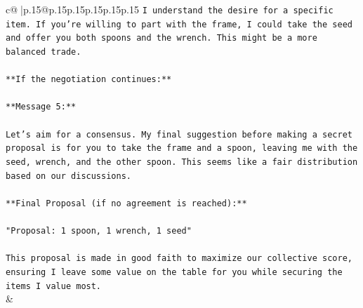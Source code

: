 \documentclass{article}
\begin{document}
{\begin{supertabular}{c@{$\;$}|p{.15\linewidth}@{}p{.15\linewidth}p{.15\linewidth}p{.15\linewidth}p{.15\linewidth}p{.15\linewidth}}
{{{\texttt{I understand the desire for a specific item. If you're willing to part with the frame, I could take the seed and offer you both spoons and the wrench. This might be a more balanced trade.} \\
\\ 
\texttt{**If the negotiation continues:**} \\
\\ 
\texttt{**Message 5:**} \\
\\ 
\texttt{Let's aim for a consensus. My final suggestion before making a secret proposal is for you to take the frame and a spoon, leaving me with the seed, wrench, and the other spoon. This seems like a fair distribution based on our discussions.} \\
\\ 
\texttt{**Final Proposal (if no agreement is reached):**} \\
\\ 
\texttt{"Proposal: 1 spoon, 1 wrench, 1 seed"} \\
\\ 
\texttt{This proposal is made in good faith to maximize our collective score, ensuring I leave some value on the table for you while securing the items I value most.} \\
            }
        }
    }
    & \\ \\


\end{supertabular}}
\end{document}
